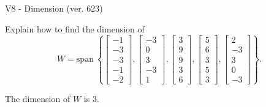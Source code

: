 \begin{exercise}
  \begin{exerciseTitle}V8 - Dimension (ver. 623)\end{exerciseTitle}
  \begin{exerciseStatement}
    Explain how to find the dimension of 
\[W=\mathrm{span}\ \left\{\left[\begin{array}{r}
-1 \\
-3 \\
-3 \\
-1 \\
-2
\end{array}\right] , \left[\begin{array}{r}
-3 \\
0 \\
3 \\
-3 \\
1
\end{array}\right] , \left[\begin{array}{r}
3 \\
9 \\
9 \\
3 \\
6
\end{array}\right] , \left[\begin{array}{r}
5 \\
6 \\
3 \\
5 \\
3
\end{array}\right] , \left[\begin{array}{r}
2 \\
-3 \\
3 \\
0 \\
-3
\end{array}\right]\right\}.\]



  \end{exerciseStatement}
  \begin{exerciseAnswer}
   The dimension of \(W\) is  \(3\).
  


  \end{exerciseAnswer}
\end{exercise}